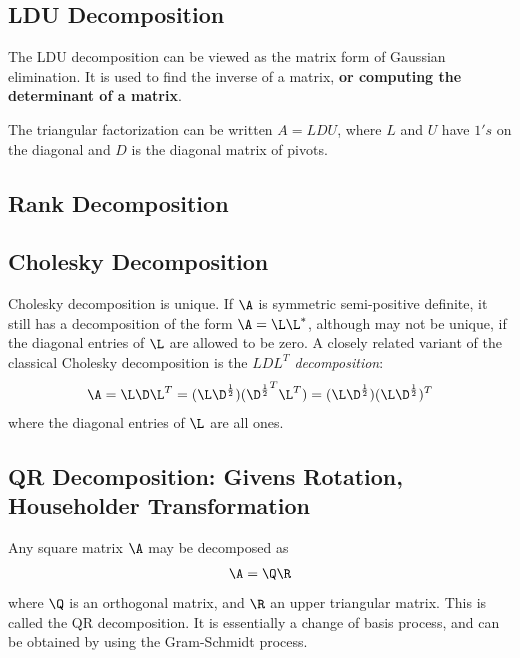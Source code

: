 {\subsection{LDU Decomposition}
The LDU decomposition can be viewed as the matrix form of Gaussian elimination. It is used to find the inverse of a matrix, {\bf{or computing the determinant of a matrix}}.

\begin{rmk}
	The triangular factorization can be written $A=LDU$, where $L$ and $U$  have $1's$ on the diagonal and $D$ is the diagonal matrix of pivots.
\end{rmk}
\subsection{Rank Decomposition}
\subsection{Cholesky Decomposition}


Cholesky decomposition is unique. If $\A$ is symmetric semi-positive definite, it still has a decomposition of the form $\A = \L\L^*$, although may not be unique, if the diagonal entries of $\L$ are allowed to be zero. A closely related variant of the classical Cholesky decomposition is the {\em{$LDL^T$ decomposition}}:
\begin{align}
	\A = \L\D\L^T = (\L\D^{\frac{1}{2}}) ({\D^{\frac{1}{2}}}^T\L^T) = (\L\D^{\frac{1}{2}}) (\L\D^{\frac{1}{2}})^T
\end{align}
where the diagonal entries of $\L$ are all ones.


\subsection{QR Decomposition: Givens Rotation, Householder Transformation}
Any square matrix $\A$ may be decomposed as
\begin{align}
	\A = \Q\R
\end{align}
where $\Q$ is an orthogonal matrix, and $\R$ an upper triangular matrix. This is called the QR decomposition. It is essentially a change of basis process, and can be obtained by using the Gram-Schmidt process.


}
